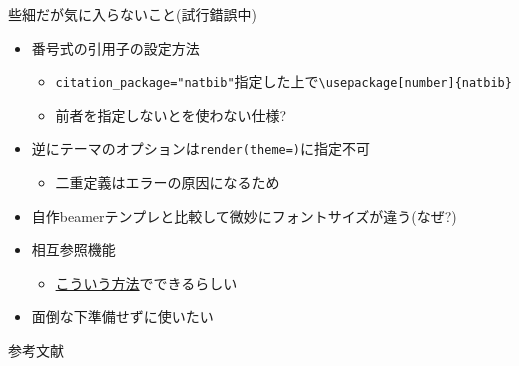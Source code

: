 \documentclass[
  14pt,
  ignorenonframetext,
]{beamer}
\newif\ifbibliography
\providecommand{\tightlist}{%
  \setlength{\itemsep}{0pt}\setlength{\parskip}{0pt}}
\begin{document}
\begin{frame}[fragile]{些細だが気に入らないこと(試行錯誤中)}
\protect\hypertarget{ux4e9bux7d30ux3060ux304cux6c17ux306bux5165ux3089ux306aux3044ux3053ux3068ux8a66ux884cux932fux8aa4ux4e2d}{}

\begin{itemize}
\tightlist
\item
  番号式の引用子の設定方法

  \begin{itemize}
  \tightlist
  \item
    \texttt{citation\_package="natbib"}指定した上で\texttt{\textbackslash{}usepackage{[}number{]}\{natbib\}}
  \item
    前者を指定しないと\BibTeX を使わない仕様?
  \end{itemize}
\item
  逆にテーマのオプションは\texttt{render(theme=)}に指定不可

  \begin{itemize}
  \tightlist
  \item
    二重定義はエラーの原因になるため
  \end{itemize}
\item
  自作beamerテンプレと比較して微妙にフォントサイズが違う(なぜ?)
\item
  相互参照機能

  \begin{itemize}
  \tightlist
  \item
    \href{https://stackoverflow.com/questions/54041552/impossible-to-cross-referring-figures-and-tables-with-beamer-presentation-opti}{こういう方法}でできるらしい
  \end{itemize}
\item
  面倒な下準備せずに\upBibTeX 使いたい
\end{itemize}

\end{frame}

\renewcommand\refname{参考文献}
\begin{frame}[allowframebreaks]{参考文献}
  \bibliographytrue
  
\end{frame}
\end{document}
